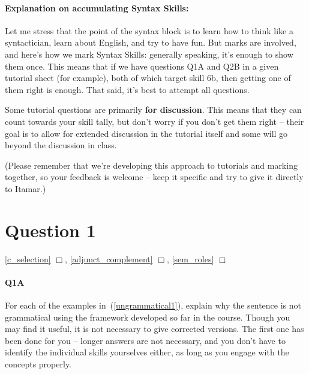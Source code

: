 \documentclass{article}
\begin{document}
\maketitle
\subtitle{Tutorial Notes Week 6: Topics 4, 5 \& 6}

\paragraph{Explanation on accumulating Syntax Skills:} Let me stress that the point of the syntax block is to learn how to think like a syntactician, learn about English, and try to have fun. But marks are involved, and here's how we mark Syntax Skills: generally speaking, it's enough to show them once. This means that if we have questions Q1A and Q2B in a given tutorial sheet (for example), both of which target skill 6b, then getting one of them right is enough. That said, it's best to attempt all questions.

Some tutorial questions are primarily \textbf{for discussion}. This means that they can count towards your skill tally, but don't worry if you don't get them right -- their goal is to allow for extended discussion in the tutorial itself and some will go beyond the discussion in class.

(Please remember that we're developing this approach to tutorials and marking together, so your feedback is welcome -- keep it specific and try to give it directly to Itamar.)

\section*{Question 1}
\hfill{} \ref{c_selection} $\Box$, \ref{adjunct_complement} $\Box$, \ref{sem_roles} $\Box$

\paragraph{Q1A} For each of the examples in~(\ref{ungrammatical1}), explain why the sentence is not grammatical using the framework developed so far in the course.
Though you may find it useful, it is not necessary to give corrected versions. The first one has been done for you -- longer answers are not necessary, and you don't have to identify the individual skills yourselves either, as long as you engage with the concepts properly.
\end{document}
